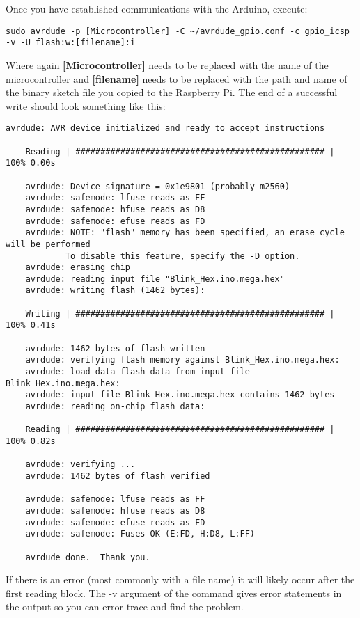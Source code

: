     Once you have established communications with the Arduino, execute:

    \begin{lstlisting}[style=kaolstplain,linewidth=1.5\textwidth]
    sudo avrdude -p [Microcontroller] -C ~/avrdude_gpio.conf -c gpio_icsp -v -U flash:w:[filename]:i
    \end{lstlisting}

    Where again \textbf{[Microcontroller]} needs to be replaced with the name of the microcontroller and \textbf{[filename]} needs to be replaced with the path and name of the binary sketch file you copied to the Raspberry Pi.
    The end of a successful write should look something like this:

    \begin{lstlisting}[style=kaolstplain,linewidth=1.5\textwidth]
    avrdude: AVR device initialized and ready to accept instructions

    Reading | ################################################## | 100% 0.00s

    avrdude: Device signature = 0x1e9801 (probably m2560)
    avrdude: safemode: lfuse reads as FF
    avrdude: safemode: hfuse reads as D8
    avrdude: safemode: efuse reads as FD
    avrdude: NOTE: "flash" memory has been specified, an erase cycle will be performed
            To disable this feature, specify the -D option.
    avrdude: erasing chip
    avrdude: reading input file "Blink_Hex.ino.mega.hex"
    avrdude: writing flash (1462 bytes):

    Writing | ################################################## | 100% 0.41s

    avrdude: 1462 bytes of flash written
    avrdude: verifying flash memory against Blink_Hex.ino.mega.hex:
    avrdude: load data flash data from input file Blink_Hex.ino.mega.hex:
    avrdude: input file Blink_Hex.ino.mega.hex contains 1462 bytes
    avrdude: reading on-chip flash data:

    Reading | ################################################## | 100% 0.82s

    avrdude: verifying ...
    avrdude: 1462 bytes of flash verified

    avrdude: safemode: lfuse reads as FF
    avrdude: safemode: hfuse reads as D8
    avrdude: safemode: efuse reads as FD
    avrdude: safemode: Fuses OK (E:FD, H:D8, L:FF)

    avrdude done.  Thank you.
    \end{lstlisting}

    If there is an error (most commonly with a file name) it will likely occur after the first reading block. 
    The -v argument of the command gives error statements in the output so you can error trace and find the problem. 

